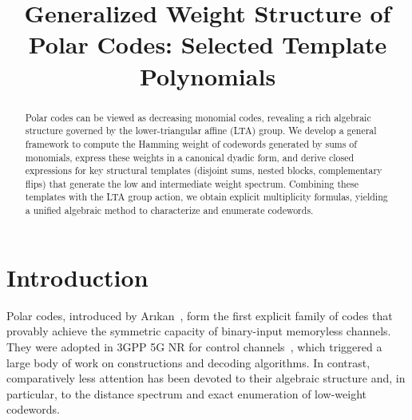 \documentclass[conference]{IEEEtran}
\theoremstyle{definition}
\begin{document}
\title{Generalized Weight Structure of Polar Codes: Selected Template Polynomials}

\author{
\and
{}
}

\maketitle
\pagestyle{empty}

\begin{abstract}
Polar codes can be viewed as decreasing monomial codes, revealing a rich algebraic structure governed by the lower-triangular affine (LTA) group. We develop a general framework to compute the Hamming weight of codewords generated by sums of monomials, express these weights in a canonical dyadic form, and derive closed expressions for key structural templates (disjoint sums, nested blocks, complementary flips) that generate the low and intermediate weight spectrum. Combining these templates with the LTA group action, we obtain explicit multiplicity formulas, yielding a unified algebraic method to characterize and enumerate codewords. %
\end{abstract}


\section{Introduction}
Polar codes, introduced by Ar{\i}kan~\cite{arikan}, form the first explicit family of codes that provably achieve the symmetric capacity of binary-input memoryless channels. They were adopted in 3GPP 5G NR for control channels~\cite{3GPP}, which triggered a large body of work on constructions and decoding algorithms. In contrast, comparatively less attention has been devoted to their algebraic structure and, in particular, to the distance spectrum and exact enumeration of low-weight codewords.
\end{document}
